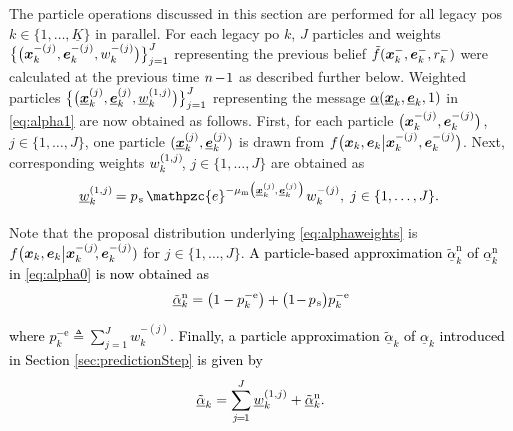 \documentclass[10pt, twoside, romanappendices]{IEEEtran}
\providecommand{\rd}{\textcolor{black}}
\providecommand{\ist}{\hspace*{.3mm}}
\providecommand{\rmv}{\hspace*{-.3mm}}
\providecommand{\iist}{\hspace*{1mm}}
\providecommand{\nn}{\nonumber}
\begin{document}
The particle operations discussed in this section are performed for all legacy \acp{po} $k \!\in\! \{1,\dots,\underline{K}\}$ in parallel. For each legacy \ac{po} $k$, $J$ particles and weights 
$\big\{ \big( \bm{x}^{-(j)}_{k}, \bm{e}^{-(j)}_{k}, w^{-(j)}_{k} \big) \big\}_{j=1}^{J}$ representing the previous belief $\tilde{f}( \bm{x}^{-}_{k}, \bm{e}^{-}_{k}, r^{-}_{k})$ were calculated at the previous time $n \rmv-\! 1$ as described further below. Weighted particles $\big\{ \big( \underline{\bm{x}}^{(j)}_{k}, \underline{\bm{e}}^{(j)}_{k}, \underline{w}^{(1,j)}_{k} \big) \big\}_{j=1}^{J}$ 
representing the message $\underline{\alpha}(\underline{\bm{x}}_{k},\underline{\bm{e}}_{k},1)$ in \eqref{eq:alpha1} are now obtained as 
follows. First, for each particle $\big(\V{x}^{-(j)}_{k},\V{e}^{-(j)}_{k}\big)\ist$, $j \in \{1,\dots,J\}$, one particle $(\underline{\bm{x}}^{(j)}_{k},\underline{\bm{e}}^{(j)}_{k})$ is drawn from $f\big( \bm{x}_{k}, \bm{e}_{k} \big| \bm{x}^{-(j)}_{k}, \bm{e}^{-(j)}_{k}\big)$. 
Next, corresponding weights $w^{(1,j)}_{k} \rmv\rmv$, $j \in \{1,\dots,J\}$ are obtained \vspace{.5mm} as
\begin{align}
\hspace{-1mm} \underline{w}^{(1,j)}_{k} \rmv= p_{\ist\mathrm{s}} \ist\ist \mathpzc{e}^{-\mu_{\mathrm{m}}\big(\underline{\V{x}}^{(j)}_{k}\rmv, \ist\underline{\V{e}}^{(j)}_{k}\big)} \ist w^{-(j)}_{k}, \iist j \in \{1, \dots, J \}. \label{eq:alphaweights}\\[-3mm]
\nn
\end{align}
Note that the proposal distribution \cite{AruMasGorCla:02, DouFreGor:01} underlying \eqref{eq:alphaweights} is $f\big( \V{x}_{k}, \V{e}_{k} \big| \V{x}^{-(j)}_{k}\rmv\rmv\rmv, \V{e}^{-(j)}_{k})$ for $j \in \{1,\dots,J\}$.
\rd{A particle-based approximation $\tilde{\underline{\alpha}}^{\mathrm{n}}_k$ of $\underline{\alpha}^{\mathrm{n}}_k$ in \eqref{eq:alpha0} is now obtained \vspace{1mm} as
\begin{align}
\tilde{\underline{\alpha}}^{\mathrm{n}}_k = \big(1-p^{-\text{e}}_{k}\big) + \big(1\!-\rmv p_{\ist\mathrm{s}}\big) p^{-\text{e}}_{k}\rmv\label{eq:alpha1a} \\[-4mm]
\nn
\end{align}
where $p^{-\text{e}}_{k} \triangleq \sum^{J}_{j=1} w^{-(j)}_{k}$. Finally, a particle approximation $\tilde{\underline{\alpha}}_k$ of $\underline{\alpha}_k$ introduced in Section \ref{sec:predictionStep} is given \vspace{-1mm} by
\begin{align}
\tilde{\underline{\alpha}}_k = \sum^{J}_{j\rmv=\rmv1} \underline{w}^{(1,j)}_{k} + \tilde{\underline{\alpha}}^{\mathrm{n}}_k. 
\nn\\[-13mm]
\nn
\end{align}}
\end{document}
